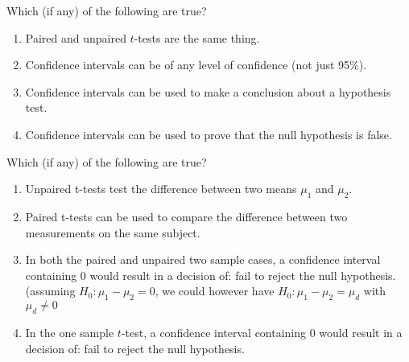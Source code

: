 \documentclass[xcolor=svgnames, 10pt, handout]{beamer}
\begin{document}
\begin{frame}[fragile]
\begin{question}
Which (if any) of the following are true?
\begin{enumerate}
\item Paired and unpaired $t$-tests are the same thing. \onslide<+-> \pxmark
\item Confidence intervals can be of any level of confidence (not just 95\%). \pcmark
\item Confidence intervals can be used to make a conclusion about a hypothesis test. \pcmark
\item Confidence intervals can be used to prove that the null hypothesis is false. \pxmark
\end{enumerate}
\end{question}
\end{frame}


\begin{frame}[fragile]
\begin{question}
Which (if any) of the following are true?
\begin{enumerate}
\item Unpaired t-tests test the difference between two means $\mu_1$ and $\mu_2$. 
\item Paired t-tests can be used to compare the difference between two measurements on the same subject.\pcmark
\item In both the paired and unpaired two sample cases, a confidence interval containing 0 would result in a decision of: fail to reject the null hypothesis.\pcmark (assuming $H_0: \mu_1 - \mu_2 = 0$, we could however have $H_0: \mu_1 - \mu_2 = \mu_d$ with $\mu_d\neq 0$
\item  In the one sample $t$-test, a confidence interval containing 0 would result in a decision of: fail to reject the null hypothesis.\pxmark
\end{enumerate}
\end{question}
\end{frame}
\end{document}
